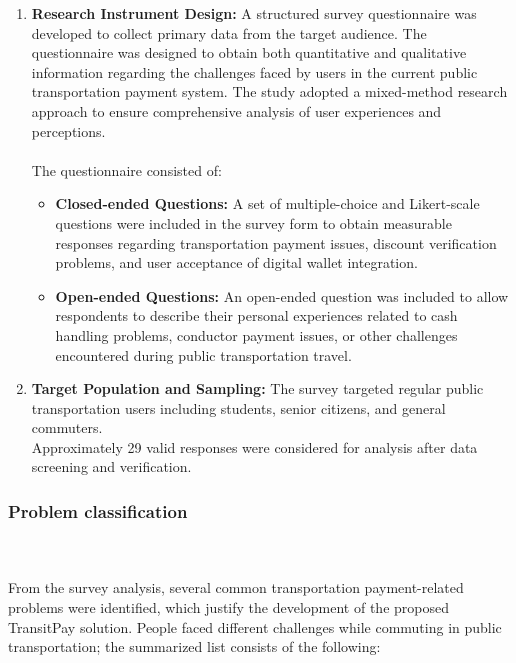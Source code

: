 \documentclass[manuscript,review,anonymous]{acmart}
\begin{document}
\begin{enumerate}

\item \textbf{Research Instrument Design:} 
A structured survey questionnaire was developed to collect primary data from the target audience. The questionnaire was designed to obtain both quantitative and qualitative information regarding the challenges faced by users in the current public transportation payment system. The study adopted a mixed-method research approach to ensure comprehensive analysis of user experiences and perceptions.
\\
\\
The questionnaire consisted of:
\\
\begin{itemize}

\item \textbf{Closed-ended Questions:} 
A set of multiple-choice and Likert-scale questions were included in the survey form to obtain measurable responses regarding transportation payment issues, discount verification problems, and user acceptance of digital wallet integration.

\item \textbf{Open-ended Questions:} 
An open-ended question was included to allow respondents to describe their personal experiences related to cash handling problems, conductor payment issues, or other challenges encountered during public transportation travel.
\\
\end{itemize}

\item \textbf{Target Population and Sampling:} The survey targeted regular public transportation users including students, senior citizens, and general commuters.
\\
Approximately 29 valid responses were considered for analysis after data screening and verification.

\end{enumerate}
\subsubsection{Problem classification} \mbox{} \\
\\
From the survey analysis, several common transportation payment-related problems were identified, which justify the development of the proposed TransitPay solution. People faced different challenges while commuting in public transportation; the summarized list consists of the following:
\end{document}
